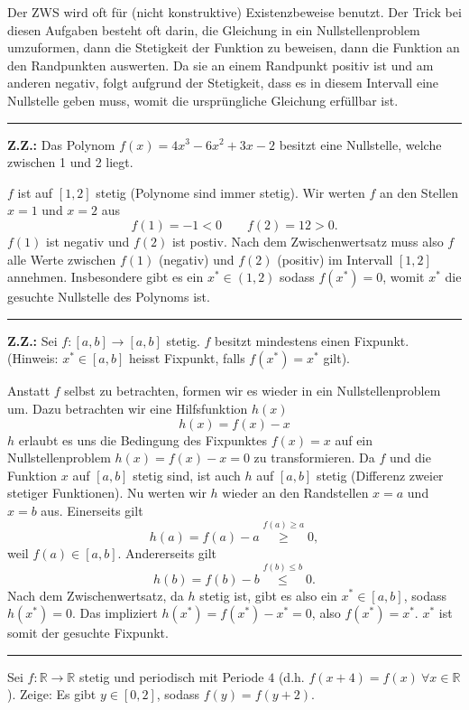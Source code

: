 \documentclass[a4paper,landscape,8pt]{extarticle}
\newcommand{\R}{\mathbb{R}}
\newcommand{\sep}{\vspace{5pt}\noindent\hrule\vspace{5pt}}
\newcommand{\ZZ}{\textbf{Z.Z.: }}
\begin{document}
\begin{multicols*}{4}
\Vorgehen Der ZWS wird oft für (nicht konstruktive) Existenzbeweise benutzt. Der
Trick bei diesen Aufgaben besteht oft darin, die Gleichung in ein
Nullstellenproblem umzuformen, dann die Stetigkeit der Funktion zu beweisen,
dann die Funktion an den Randpunkten auswerten. Da sie an einem Randpunkt
positiv ist und am anderen negativ, folgt aufgrund der Stetigkeit, dass es in
diesem Intervall eine Nullstelle geben muss, womit die ursprüngliche Gleichung
erfüllbar ist.

\begin{warmup}
\sep

\Bsp \ZZ Das Polynom $f(x)=4x^3-6x^2+3x-2$ besitzt eine Nullstelle, welche
zwischen 1 und 2 liegt.

$f$ ist auf $[1,2]$ stetig (Polynome sind immer stetig). Wir werten $f$ an den
Stellen $x=1$ und $x=2$ aus
\[
f(1)=-1<0 \qquad f(2)=12 > 0.
\]
$f(1)$ ist negativ und $f(2)$ ist postiv. Nach dem Zwischenwertsatz muss also
$f$ alle Werte zwischen $f(1)$ (negativ) und $f(2)$ (positiv) im Intervall
$[1,2]$ annehmen. Insbesondere gibt es ein $x^*\in(1,2)$ sodass $f(x^*)=0$,
womit $x^*$ die gesuchte Nullstelle des Polynoms ist.

\sep

\Bsp \ZZ Sei $f\colon[a,b]\to[a,b]$ stetig. $f$ besitzt mindestens einen
Fixpunkt. (Hinweis: $x^*\in[a,b]$ heisst Fixpunkt, falls $f(x^*)=x^*$ gilt).

Anstatt $f$ selbst zu betrachten, formen wir es wieder in ein Nullstellenproblem
um. Dazu betrachten wir eine Hilfsfunktion $h(x)$
\[
h(x) = f(x) - x
\]
$h$ erlaubt es uns die Bedingung des Fixpunktes $f(x)=x$ auf ein
Nullstellenproblem $h(x)=f(x)-x=0$ zu transformieren. Da $f$ und die Funktion
$x$ auf $[a,b]$ stetig sind, ist auch $h$ auf $[a,b]$ stetig (Differenz zweier
stetiger Funktionen). Nu werten wir $h$ wieder an den Randstellen $x=a$ und
$x=b$ aus. Einerseits gilt
\[
h(a) = f(a) -a \stackrel{f(a)\geq a}\geq 0,
\]
weil $f(a)\in[a,b]$. Andererseits gilt
\[
h(b) = f(b)-b \stackrel{f(b)\leq b} \leq 0.
\]
Nach dem Zwischenwertsatz, da $h$ stetig ist, gibt es also ein $x^*\in[a,b]$,
sodass $h(x^*)=0$. Das impliziert $h(x^*)=f(x^*)-x^*=0$, also $f(x^*)=x^*$.
$x^*$ ist somit der gesuchte Fixpunkt.

\sep

\Bsp Sei $f\colon\R\to\R$ stetig und periodisch mit Periode $4$ (d.h.
$f(x+4)=f(x) \ \forall x \in \R$). Zeige: Es gibt $y\in[0,2]$, sodass
$f(y)=f(y+2)$.


\end{warmup}
\end{multicols*}
\end{document}
